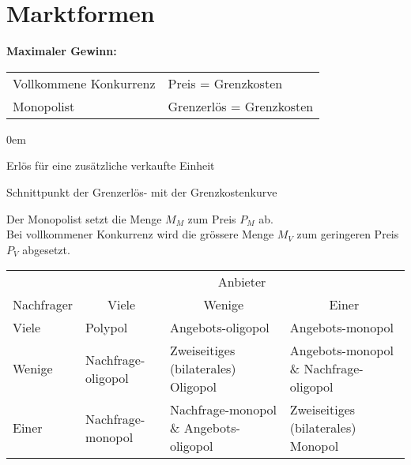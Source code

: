 \section{Marktformen}
\textbf{Maximaler Gewinn:}
\settowidth{\MyLenA}{Vollkommene Konkurrenz~~}
\begin{tabular}{@{}p{\the\MyLenA}%
 				@{}p{\linewidth-\the\MyLenA}}
 	Vollkommene Konkurrenz & Preis = Grenzkosten\\
	Monopolist & Grenzerlös = Grenzkosten
\end{tabular}

\begin{description}\itemsep0em
	\item [Grenzerlös] Erlös für eine zusätzliche verkaufte Einheit
	\item [Cournotscher Punkt] Schnittpunkt der Grenzerlös- mit der Grenzkostenkurve
\end{description}

\begin{center}
\end{center}

Der Monopolist setzt die Menge $M_M$ zum Preis $P_M$ ab.\\ 
Bei vollkommener Konkurrenz wird die grössere Menge $M_V$ zum geringeren Preis $P_V$ abgesetzt.

\begin{tabular}{l|p{1.6cm}|p{1.6cm}|p{1.6cm}}
	& \multicolumn{3}{c}{Anbieter}\\
	Nachfrager & \multicolumn{1}{c|}{Viele} & \multicolumn{1}{c|}{Wenige} & \multicolumn{1}{c}{Einer}\\\hline
	Viele & Polypol & Angebots-oligopol & Angebots-monopol \\\hline
	Wenige & Nachfrage-oligopol & Zweiseitiges (bilaterales) Oligopol & Angebots-monopol \& Nachfrage- oligopol\\\hline
	Einer & Nachfrage-monopol & Nachfrage-monopol \& Angebots-oligopol & Zweiseitiges (bilaterales) Monopol \\\hline
\end{tabular}

